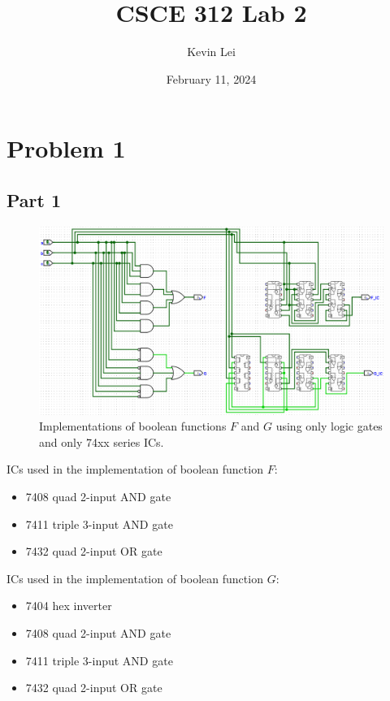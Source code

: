 \documentclass{article}
\title{CSCE 312 Lab 2}
\author{Kevin Lei}
\date{February 11, 2024}
\begin{document}
\maketitle

\section{Problem 1}

\subsection{Part 1}

\begin{figure}[H]
    \centering
    \includegraphics[width=\textwidth]{./images/circuit1.png}
    \caption{Implementations of boolean functions $F$ and $G$ using only logic gates and only 74xx series ICs.}
\end{figure}

ICs used in the implementation of boolean function $F$:
\begin{itemize}
    \item 7408 quad 2-input AND gate
    \item 7411 triple 3-input AND gate
    \item 7432 quad 2-input OR gate
\end{itemize}

\noindent ICs used in the implementation of boolean function $G$:
\begin{itemize}
    \item 7404 hex inverter
    \item 7408 quad 2-input AND gate
    \item 7411 triple 3-input AND gate
    \item 7432 quad 2-input OR gate
\end{itemize}
\end{document}

